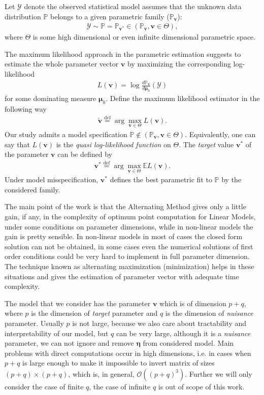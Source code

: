 Let $\bm{\mathcal{Y}}$ denote the observed statistical model assumes that the unknown data distribution $\mathbb{P}$ belongs to a given parametric family ($\mathbb{P}_{\bm{v}}$):
\begin{eqnarray}
\bm{\mathcal{Y}} \sim \mathbb{P} = \mathbb{P}_{\bm{v}^*} \in (\mathbb{P}_{\bm{v}}, \bm{v} \in \Theta),
\end{eqnarray}
where $\Theta$ is some high dimensional or even infinite dimensional parametric space.
\par The maximum likelihood approach in the parametric estimation suggests to estimate the whole parameter vector $\bm{v}$ by maximizing the corresponding log-likelihood 
\begin{eqnarray*}
L(\bm{v}) = \log \frac {d\mathbb{P}_{\bm{v}}}{d \bm{\mu}_0} (\bm{\mathcal{Y}})
\end{eqnarray*}
for some dominating measure $\bm{\mu}_0$. Define the maximum likelihood estimator in the following way
\begin{eqnarray}
\tilde{\bm{v}} \stackrel{\mathrm{def}}{=} \arg\max_{\bm{v} \in \Theta} L(\bm{v}).
\end{eqnarray}
Our study admits a model specification $\mathbb{P} \notin (\mathbb{P}_{\bm{v}}, \bm{v} \in \Theta)$. Equivalently, one can say that $L(\bm{v})$ is the {\it{quasi log-likelihood function}} on $\Theta$. The {\it{target}} value $\bm{v}^*$ of the parameter $\bm{v}$ can be defined by 
\begin{eqnarray}
{\bm{v}}^* \stackrel{\mathrm{def}}{=} \arg\max_{\bm{v} \in \Theta} \mathbb{E} L(\bm{v}).
\end{eqnarray}
Under model misspecification, $\bm{v}^*$ defines the best parametric fit to $\mathbb{P}$ by the considered family.
\par The main point of the work is that the Alternating Method gives only a little gain, if any, in the complexity of optimum point computation for Linear Models, under some conditions on parameter dimensions, while in non-linear models the gain is pretty sensible. In non-linear models in most of cases the closed form solution can not be obtained, in some cases even the numerical solutions of first order conditions could be very hard to implement in full parameter dimension. The technique known as alternating maximization (minimization) helps in these situations and gives the estimation of parameter vector with adequate time complexity.  

The model that we consider has the parameter $\bm{v}$ which is of dimension $p+q$, where $p$ is the dimension of {\it{target}} parameter and $q$ is the dimension of {\it{nuisance}} parameter. Usually $p$ is not large, because we also care about tractability and interpretability of our model, but $q$ can be very large, although it is a {\it{nuisance}} parameter, we can not ignore and remove $\bm{\eta}$ from considered model.  Main problems with direct computations occur in high dimensions, i.e. in cases when $p+q$ is large enough to make it impossible to invert matrix of sizes $(p+q) \times (p+q)$, which is, in general, $\mathcal{O}((p+q)^3)$. Further we will only consider the case of finite $q$, the case of infinite $q$ is out of scope of this work.

